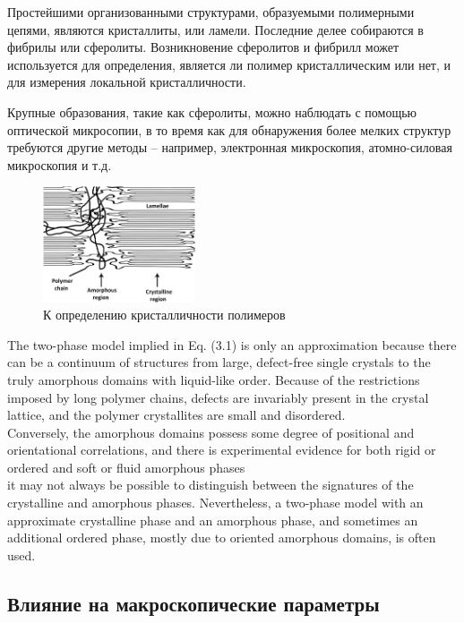 Простейшими организованными структурами, образуемыми полимерными цепями, являются кристаллиты, или ламели. Последние делее собираются в фибрилы или сферолиты. Возникновение сферолитов и фибрилл может
используется для определения, является ли полимер кристаллическим или нет, и для измерения локальной кристалличности.

Крупные образования, такие как сферолиты, можно наблюдать с помощью оптической микросопии, в то время как для обнаружения более мелких структур требуются другие методы -- например, электронная микроскопия, атомно-силовая микроскопия и т.д.

	\begin{figure} 
\vspace{-20pt}
  \begin{center}
    \includegraphics[width=0.4\textwidth]{fig/crystal-2.jpg}
    \caption{К определению кристалличности полимеров}
    \label{fig:crystal-2}
  \end{center}
  \vspace{-20pt}
  \vspace{1pt}
\end{figure}	

The two-phase model implied in Eq. (3.1) is only an approximation because
there can be a continuum of structures from large, defect-free single crystals to
the truly amorphous domains with liquid-like order. Because of the restrictions
imposed by long polymer chains, defects are invariably present in the crystal lattice,
and the polymer crystallites are small and disordered.\\
Conversely, the amorphous
domains possess some degree of positional and orientational correlations, and there
is experimental evidence for both rigid or ordered and soft or fluid amorphous phases\\
it may not always be possible to distinguish between the signatures
of the crystalline and amorphous phases. Nevertheless, a two-phase model with
an approximate crystalline phase and an amorphous phase, and sometimes an additional
ordered phase, mostly due to oriented amorphous domains, is often used.\\



\subsection{Влияние на макроскопические параметры}





	